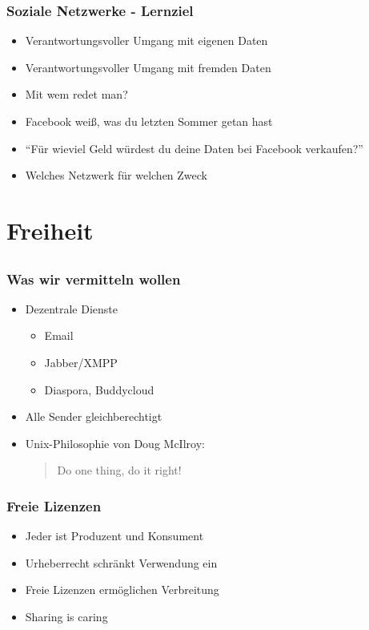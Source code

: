 \documentclass[14pt,handout]{beamer}
\newcommand{\ben}[1]{\pdfcomment[author=Ben]{#1}}
\begin{document}
\begin{frame}
  \frametitle{Soziale Netzwerke - Lernziel}
  \begin{itemize}
    \item<2-> Verantwortungsvoller Umgang mit eigenen Daten
    \item<3-> Verantwortungsvoller Umgang mit fremden Daten
    \item<4-> Mit wem redet man?
    \item<5-> Facebook weiß, was du letzten Sommer getan hast
    \item<6-> "`Für wieviel Geld würdest du deine Daten bei Facebook verkaufen?"'
    \item<7-> Welches Netzwerk für welchen Zweck
  \end{itemize}
\end{frame}

\section{Freiheit}
\subsection{}

\begin{frame}
  \frametitle{Was wir vermitteln wollen}
  \begin{itemize}
    \item<2-> Dezentrale Dienste
      \begin{itemize}
        \item<3-> Email
        \item<4-> Jabber/XMPP
        \item<5-> Diaspora, Buddycloud
      \end{itemize}
    \item<6-> Alle Sender gleichberechtigt
    \item<7-> Unix-Philosophie von Doug McIlroy:
        \begin{quote}Do one thing, do it right!
        \end{quote}
  \end{itemize}
\end{frame}

\begin{frame}
  \frametitle{Freie Lizenzen}
  \begin{itemize}
    \item<2-> Jeder ist Produzent und Konsument
    \item<3-> Urheberrecht schränkt Verwendung ein
    \item<4-> Freie Lizenzen ermöglichen Verbreitung
    \item<5-> Sharing is caring
  \end{itemize}
\end{frame}
\end{document}
